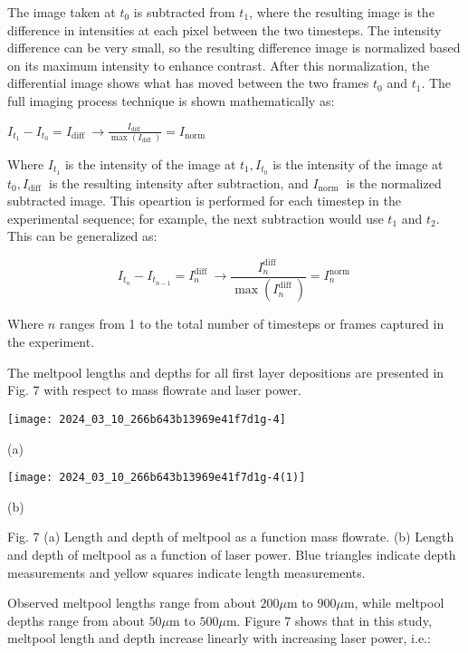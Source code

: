 \documentclass[10pt]{article}
\begin{document}
The image taken at $t_{0}$ is subtracted from $t_{1}$, where the resulting image is the difference in intensities at each pixel between the two timesteps. The intensity difference can be very small, so the resulting difference image is normalized based on its maximum intensity to enhance contrast. After this normalization, the differential image shows what has moved between the two frames $t_{0}$ and $t_{1}$. The full imaging process technique is shown mathematically as:

$I_{t_{1}}-I_{t_{0}}=I_{\text {diff }} \rightarrow \frac{I_{\text {diff }}}{\max \left(I_{\text {diff }}\right)}=I_{\text {norm }}$

Where $I_{t_{1}}$ is the intensity of the image at $t_{1}, I_{t_{0}}$ is the intensity of the image at $t_{0}, I_{\text {diff }}$ is the resulting intensity after subtraction, and $I_{\text {norm }}$ is the normalized subtracted image. This opeartion is performed for each timestep in the experimental sequence; for example, the next subtraction would use $t_{1}$ and $t_{2}$. This can be generalized as:


\begin{equation*}
I_{t_{n}}-I_{t_{n-1}}=I_{n}^{\text {diff }} \rightarrow \frac{I_{n}^{\text {diff }}}{\max \left(I_{n}^{\text {diff }}\right)}=I_{n}^{\text {norm }} \tag{3}
\end{equation*}


Where $n$ ranges from 1 to the total number of timesteps or frames captured in the experiment.

The meltpool lengths and depths for all first layer depositions are presented in Fig. 7 with respect to mass flowrate and laser power.

\begin{center}
\texttt{[image: 2024\_03\_10\_266b643b13969e41f7d1g-4]}
\end{center}

(a)

\begin{center}
\texttt{[image: 2024\_03\_10\_266b643b13969e41f7d1g-4(1)]}
\end{center}

(b)

Fig. 7 (a) Length and depth of meltpool as a function mass flowrate. (b) Length and depth of meltpool as a function of laser power. Blue triangles indicate depth measurements and yellow squares indicate length measurements.

Observed meltpool lengths range from about $200 \mu \mathrm{m}$ to $900 \mu \mathrm{m}$, while meltpool depths range from about $50 \mu \mathrm{m}$ to $500 \mu \mathrm{m}$. Figure 7 shows that in this study, meltpool length and depth increase linearly with increasing laser power, i.e.:
\end{document}

